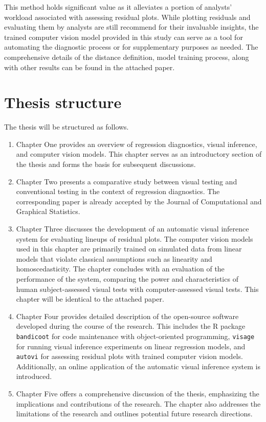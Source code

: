 \documentclass[11pt,a4paper,]{article}
\begin{document}
This method holds significant value as it alleviates a portion of analysts' workload associated with assessing residual plots. While plotting residuals and evaluating them by analysts are still recommend for their invaluable insights, the trained computer vision model provided in this study can serve as a tool for automating the diagnostic process or for supplementary purposes as needed. The comprehensive details of the distance definition, model training process, along with other results can be found in the attached paper.

\hypertarget{thesis-structure}{%
\section{Thesis structure}\label{thesis-structure}}

The thesis will be structured as follows.

\begin{enumerate}
\def\labelenumi{\arabic{enumi}.}
\item
  Chapter One provides an overview of regression diagnostics, visual inference, and computer vision models. This chapter serves as an introductory section of the thesis and forms the basis for subsequent discussions.
\item
  Chapter Two presents a comparative study between visual testing and conventional testing in the context of regression diagnostics. The corresponding paper is already accepted by the Journal of Computational and Graphical Statistics.
\item
  Chapter Three discusses the development of an automatic visual inference system for evaluating lineups of residual plots. The computer vision models used in this chapter are primarily trained on simulated data from linear models that violate classical assumptions such as linearity and homoscedasticity. The chapter concludes with an evaluation of the performance of the system, comparing the power and characteristics of human subject-assessed visual tests with computer-assessed visual tests. This chapter will be identical to the attached paper.
\item
  Chapter Four provides detailed description of the open-source software developed during the course of the research. This includes the R package \texttt{bandicoot} for code maintenance with object-oriented programming, \texttt{visage} for running visual inference experiments on linear regression models, and \texttt{autovi} for assessing residual plots with trained computer vision models. Additionally, an online application of the automatic visual inference system is introduced.
\item
  Chapter Five offers a comprehensive discussion of the thesis, emphasizing the implications and contributions of the research. The chapter also addresses the limitations of the research and outlines potential future research directions.
\end{enumerate}
\end{document}
